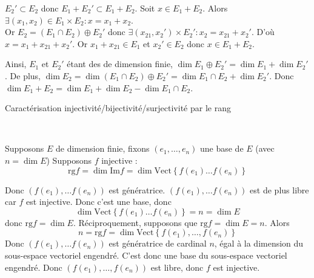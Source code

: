 \documentclass{article}
\begin{document}
\begin{question_kholle}
		$E_2' \subset E_2$ donc $E_1 + E_2' \subset E_1 + E_2$.
		Soit $x \in E_1 + E_2$.
		Alors $\exists (x_1, x_2) \in E_1 \times E_2 : x = x_1 + x_2$. \\
		Or $E_2 = \left( E_1 \cap E_2 \right) \oplus E_2'$ donc $\exists (x_{21}, x_2') \times E_2' : x_2 = x_{21} + x_2'$.
		D'où $x = x_1 + x_{21} + x_2'$. Or $x_1 + x_{21} \in E_1$ et $x_2' \in E_2$ donc $x \in E_1 + E_2$.
		
		Ainsi, $E_1$ et $E_2'$ étant des \sev de dimension finie, $\dim E_1 \oplus E_2' = \dim E_1 + \dim E_2'$.
		De plus, $\dim E_2 = \dim (E_1 \cap E_2) \oplus E_2' = \dim E_1 \cap E_2 + \dim E_2'$.
		Donc $\dim E_1 + E_2 = \dim E_1 + \dim E_2 - \dim E_1 \cap E_2$.
	\end{question_kholle}

	\begin{question_kholle}
		[Soit $f \in \mathcal{L}_{\mathbb{K}}(E, F)$.
		\begin{propositions}
			\item Si $E$ est de dimension finie 
			\begin{equation}
				f \text{ injective } \iff \mathrm{rg} f = \dim E
			\end{equation}
			\item Si $F$ est de dimension finie
			\begin{equation}
				f \text{ surjective } \iff \mathrm{rg} f = \dim F
			\end{equation}
			\item Si $E$ et $F$ sont de même dimension finie $$f \text{ bijective } \iff f \text{ injective } \iff f \text{ sujective }$$
			C'est \textit{l'accident de la dimension finie} !
		\end{propositions}]
		{Caractérisation injectivité/bijectivité/surjectivité par le rang}
		
		~
		\begin{propositions}
			\item Supposons $E$ de dimension finie, fixons $(e_{1}, \dots, e_{n})$ une base de $E$ (avec $n = \dim E$)
			Supposons $f$ injective :
			$$
			\mathrm{rg} f = \dim \mathrm{Im} f = \dim \text{Vect} \left\{ f(e_{1}) \dots f(e_{n}) \right\}  
			$$
			
			Donc $(f(e_{1}), \dots f(e_{n}))$ est génératrice.
			$(f(e_{1}), \dots f(e_{n}))$ est de plus libre car $f$ est injective.
			Donc c'est une base, donc
			$$
			\dim \text{Vect} \left\{ f(e_{1}) \dots f(e_{n}) \right\}  =n = \dim E
			$$
			donc $\mathrm{rg} f = \dim E$.
			Réciproquement, supposons que $\mathrm{rg} f = \dim E = n$.
			Alors $$n = \mathrm{rg} f = \dim \text{Vect} \left\{ f(e_{1}),\dots,f(e_{n}) \right\}$$
			Donc $(f(e_{1}), \dots f(e_{n}))$ est génératrice de cardinal $n$, égal à la dimension du sous-espace vectoriel engendré. C'est donc une base du sous-espace vectoriel engendré.
			Donc $(f(e_{1}),\dots , f(e_{n}))$ est libre, donc $f$ est injective.
			

\end{propositions}
\end{question_kholle}
\end{document}
